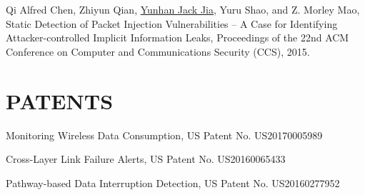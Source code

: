 \documentclass[margin]{res}
\begin{document}
\begin{resume}
Qi Alfred Chen, Zhiyun Qian, \underline{Yunhan Jack Jia}, Yuru Shao, and Z. Morley Mao, Static Detection of Packet Injection
Vulnerabilities -- A Case for Identifying Attacker-controlled Implicit Information Leaks, Proceedings of the 22nd ACM
Conference on Computer and Communications Security (CCS), 2015. \href{http://web.eecs.umich.edu/\~jackjia/material/static\_ccs15.pdf}{\color{blue}{[PDF]}}

\iffalse
\section{POSTERS/DEMOS}

\underline{Yunhan Jack Jia}, Qi Alfred Chen, and Z. Morley Mao, VoLTE Data Free-Ride Attack: A Case of Exploiting the Unprotected Voice Channel, Poster in 24th USENIX Security Symposium (Security), 2015.

Qi Alfred Chen, Zhiyun Qian, \underline{Yunhan Jack Jia}, Yuru Shao, and Z. Morley Mao, PacketGuardian: Systematic Detection of
Packet Injection Vulnerabilities using Precise Static Analysis, Poster in 24th USENIX Security Symposium (Security), 2015.

\underline{Yunhan Jack Jia}, Yihua Guo, Z. Morley Mao, Sung-Ju Lee, Collaborative DoS Attack against Cloud-hosted Web Services, Poster in 23th USENIX Security Symposium (Security), 2014. 

Qi Alfred Chen, \underline{Yunhan Jack Jia}, Zhiyun Qian and Z. Morley Mao, SystemLeakalyzer: Systematically Detecting System Side-Channels, Poster in 23th USENIX Security Symposium (Security), 2014.

Sanae Rosen, Hongyi Yao, Ashkan Nikravesh, \underline{Yunhan Jack Jia}, David Choffnes, Z Morley Mao, Demo: mapping global mobile performance trends with mobilyzer and mobiperf (MobiSys), 2014
\fi

\section{PATENTS}
Monitoring Wireless Data Consumption, US Patent No. US20170005989 \href{https://www.google.com/patents/US20170005989}{\color{blue}{[Link]}}

Cross-Layer Link Failure Alerts, US Patent No. US20160065433 \href{https://www.google.com/patents/US20160065433}{\color{blue}{[Link]}}

Pathway-based Data Interruption Detection, US Patent No. US20160277952 \href{https://www.google.com/patents/US20160277952}{\color{blue}{[Link]}}



\end{resume}
\end{document}

